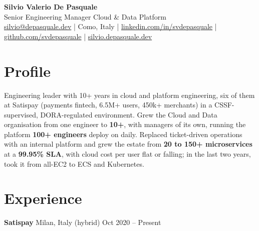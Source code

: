 \documentclass[10pt,a4paper]{article}
\newcommand{\company}[3]{%
  \needspace{9\baselineskip}%
  {\large\bfseries\color{accent}#1}\;\textcolor{muted}{\textbullet{} #2} \hfill \textcolor{muted}{#3}\par\vspace{2pt}
}
\begin{document}
\raggedright

{\fontsize{24}{28}\selectfont\bfseries\color{accent} Silvio Valerio De Pasquale}\\[3pt]
  {\large Senior Engineering Manager \textemdash{} Cloud \& Data Platform}\\[4pt]
  {\small\color{muted}
  \href{mailto:silvio@depasquale.dev}{silvio@depasquale.dev} \;|\;
  Como, Italy \;|\;
  \href{https://linkedin.com/in/svdepasquale}{linkedin.com/in/svdepasquale} \;|\;
  \href{https://github.com/svdepasquale}{github.com/svdepasquale} \;|\;
  \href{https://silvio.depasquale.dev}{silvio.depasquale.dev}}\par

\section*{Profile}
Engineering leader with 10+ years in cloud and platform engineering, six of them at Satispay (payments fintech, 6.5M+ users, 450k+ merchants) in a CSSF-supervised, DORA-regulated environment. Grew the Cloud and Data organisation from one engineer to \textbf{10+}, with managers of its own, running the platform \textbf{100+ engineers} deploy on daily. Replaced ticket-driven operations with an internal platform and grew the estate from \textbf{20 to 150+ microservices} at a \textbf{99.95\% SLA}, with cloud cost per user flat or falling; in the last two years, took it from all-EC2 to ECS and Kubernetes.

\section*{Experience}

\company{Satispay}{Milan, Italy (hybrid)}{Oct 2020 -- Present}
\end{document}
